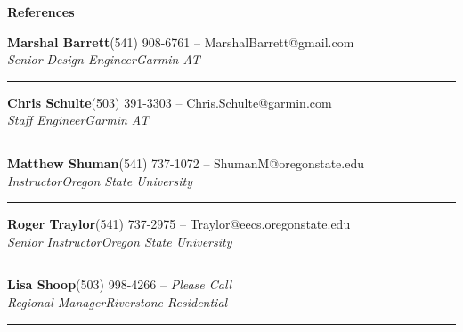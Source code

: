 \documentclass[margin, line]{res}
\newcommand{\resheading}[1]{
  \begin{tcolorbox}[width=\textwidth,
                    frame hidden,
                    colback=black!30,
                    enhanced,
                    top=0pt,
                    bottom=0pt,
                    height=16pt
                    ]
      \bf #1
  \end{tcolorbox}
  }
\newcommand{\ressubheading}[4]{
  \begin{minipage}{\textwidth}
  {\textbf{#1}\hfill #2} \\
  {\textit{#3}\hfill \textit{#4}}
  \end{minipage}
  \rule{\textwidth}{1pt}
  }
\begin{document}
\resheading{References}

    \ressubheading{Marshal Barrett}
                  {{(541) 908-6761} -- MarshalBarrett@gmail.com}
                  {Senior Design Engineer}
                  {Garmin AT}

    \ressubheading{Chris Schulte}
                  {(503) 391-3303 -- Chris.Schulte@garmin.com}
                  {Staff Engineer}
                  {Garmin AT}

    \ressubheading{Matthew Shuman}
                  {(541) 737-1072 -- ShumanM@oregonstate.edu}
                  {Instructor}
                  {Oregon State University} 

    \ressubheading{Roger Traylor}
                  {(541) 737-2975 -- Traylor@eecs.oregonstate.edu}
                  {Senior Instructor}
                  {Oregon State University}

    \ressubheading{Lisa Shoop}
                  {(503) 998-4266 -- {\it Please Call}}
                  {Regional Manager}
                  {Riverstone Residential}
\end{document}
